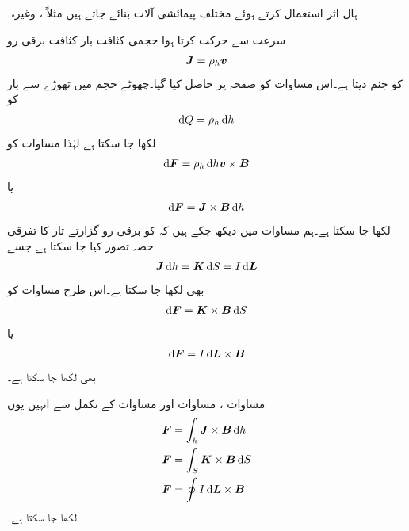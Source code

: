 ہال اثر استعمال کرتے ہوئے مختلف پیمائشی آلات بنائے جاتے ہیں مثلاً ،  وغیرہ۔

سرعت  سے حرکت کرتا ہوا حجمی کثافت بار   کثافت برقی رو 
\begin{align}
{\ensuremath{{\boldsymbol{J}}}}=\rho_h {{\boldsymbol{v}}}
\end{align}
کو جنم دیتا ہے۔اس مساوات کو صفحہ  پر حاصل کیا گیا۔چھوٹے حجم  میں تھوڑے سے بار کو
\begin{align}
\dif Q=\rho_h \dif h
\end{align}
لکھا جا سکتا ہے لہٰذا مساوات  کو
\begin{align*}
\dif \kvec{F}=\rho_h \dif h \kvec{v} \times \kvec{B}
\end{align*}
یا
\begin{align}\label{مساوات_امالہ_لورنز_تفرقی_الف}
\dif \kvec{F}=\kvec{J} \times \kvec{B} \dif h
\end{align}
لکھا جا سکتا ہے۔ہم مساوات  میں دیکھ چکے ہیں کہ  کو برقی رو گزارتے تار کا تفرقی حصہ تصور کیا جا سکتا ہے جسے 
\begin{align*}
\kvec{J} \dif h=\kvec{K} \dif S=I \dif \kvec{L}
\end{align*}
بھی لکھا جا سکتا ہے۔اس طرح مساوات  کو
\begin{align}\label{مساوات_امالہ_لورنز_تفرقی_ب}
\dif \kvec{F}=\kvec{K} \times \kvec{B} \dif S
\end{align}
یا 
\begin{align}\label{مساوات_امالہ_لورنز_تفرقی_پ}
\dif \kvec{F}=I \dif \kvec{L} \times \kvec{B}
\end{align}
بھی لکھا جا سکتا ہے۔

مساوات ، مساوات  اور مساوات  کے تکمل سے انہیں یوں
\begin{align}
\kvec{F}&=\int_h \kvec{J} \times \kvec{B} \dif h \label{مساوات_امالہ_لورنز_تکمل_ت}\\
\kvec{F}&=\int_S \kvec{K} \times \kvec{B} \dif S \label{مساوات_امالہ_لورنز_تکمل_ٹ}\\
\kvec{F}&=\oint I \dif \kvec{L} \times \kvec{B} \label{مساوات_امالہ_لورنز_تکمل_پ}
\end{align}
لکھا جا سکتا ہے۔


